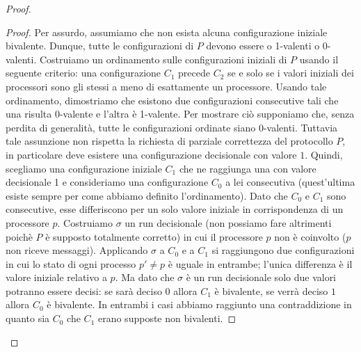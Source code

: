 \documentclass{article}
\begin{document}
\begin{proof}
\begin{proof}
Per assurdo, assumiamo che non esista alcuna configurazione iniziale bivalente. Dunque, tutte le configurazioni di $P$ devono essere o 1-valenti o 0-valenti. Costruiamo un ordinamento sulle configurazioni iniziali di $P$ usando il seguente criterio: una configurazione $C_1$ precede $C_2$ se e solo se i valori iniziali dei processori sono gli stessi a meno di esattamente un processore. Usando tale ordinamento, dimostriamo che esistono due configurazioni consecutive tali che una risulta 0-valente e l'altra è 1-valente. Per mostrare ciò supponiamo che, senza perdita di generalità, tutte le configurazioni ordinate siano 0-valenti. Tuttavia tale assunzione non rispetta la richiesta di parziale correttezza del protocollo $P$, in particolare deve esistere una configurazione decisionale con valore $1$. Quindi, scegliamo una configurazione iniziale $C_1$ che ne raggiunga una con valore decisionale 1 e consideriamo una configurazione $C_0$ a lei consecutiva (quest'ultima esiste sempre per come abbiamo definito l'ordinamento). Dato che $C_0$ e $C_1$ sono consecutive, esse differiscono per un solo valore iniziale in corrispondenza di un processore $p$. Costruiamo $\sigma$ un run decisionale (non possiamo fare altrimenti poichè $P$ è supposto totalmente corretto) in cui il processore $p$ non è coinvolto ($p$ non riceve messaggi). Applicando $\sigma$ a $C_0$ e a $C_1$ si raggiungono due configurazioni in cui lo stato di ogni processo $p'\neq p$ è uguale in entrambe; l'unica differenza è il valore iniziale relativo a $p$. Ma dato che $\sigma$ è un run decisionale solo due valori potranno essere decisi: se sarà deciso $0$ allora $C_1$ è bivalente, se verrà deciso $1$ allora $C_0$ è bivalente. In entrambi i casi abbiamo raggiunto una contraddizione in quanto sia $C_0$ che $C_1$ erano supposte non bivalenti.


 \end{proof}
 

\end{proof}
\end{document}
